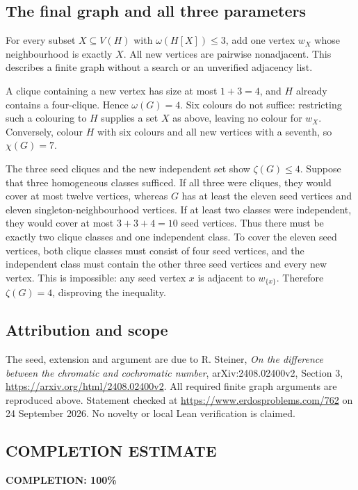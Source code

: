 \subsection*{The final graph and all three parameters}
For every subset \(X\subseteq V(H)\) with \(\omega(H[X])\leq3\), add one vertex \(w_X\) whose neighbourhood is exactly \(X\). All new vertices are pairwise nonadjacent. This describes a finite graph without a search or an unverified adjacency list.

A clique containing a new vertex has size at most \(1+3=4\), and \(H\) already contains a four-clique. Hence \(\omega(G)=4\). Six colours do not suffice: restricting such a colouring to \(H\) supplies a set \(X\) as above, leaving no colour for \(w_X\). Conversely, colour \(H\) with six colours and all new vertices with a seventh, so \(\chi(G)=7\).

The three seed cliques and the new independent set show \(\zeta(G)\leq4\). Suppose that three homogeneous classes sufficed. If all three were cliques, they would cover at most twelve vertices, whereas \(G\) has at least the eleven seed vertices and eleven singleton-neighbourhood vertices. If at least two classes were independent, they would cover at most \(3+3+4=10\) seed vertices. Thus there must be exactly two clique classes and one independent class. To cover the eleven seed vertices, both clique classes must consist of four seed vertices, and the independent class must contain the other three seed vertices and every new vertex. This is impossible: any seed vertex \(x\) is adjacent to \(w_{\{x\}}\). Therefore \(\zeta(G)=4\), disproving the inequality.

\subsection*{Attribution and scope}
The seed, extension and argument are due to R. Steiner, \emph{On the difference between the chromatic and cochromatic number}, arXiv:2408.02400v2, Section 3, \url{https://arxiv.org/html/2408.02400v2}. All required finite graph arguments are reproduced above. Statement checked at \url{https://www.erdosproblems.com/762} on 24 September 2026. No novelty or local Lean verification is claimed.
\subsection*{COMPLETION ESTIMATE}
\textbf{COMPLETION: 100\%}
